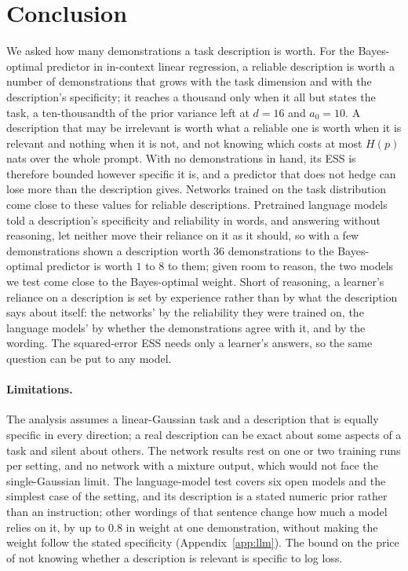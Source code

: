 \documentclass{article}
\begin{document}
\section{Conclusion}
We asked how many demonstrations a task description is worth. For the Bayes-optimal predictor in in-context linear regression, a reliable description is worth a number of demonstrations that grows with the task dimension and with the description's specificity; it reaches a thousand only when it all but states the task, a ten-thousandth of the prior variance left at $d = 16$ and $a_0 = 10$. A description that may be irrelevant is worth what a reliable one is worth when it is relevant and nothing when it is not, and not knowing which costs at most $H(p)$ nats over the whole prompt. With no demonstrations in hand, its ESS is therefore bounded however specific it is, and a predictor that does not hedge can lose more than the description gives. Networks trained on the task distribution come close to these values for reliable descriptions. Pretrained language models told a description's specificity and reliability in words, and answering without reasoning, let neither move their reliance on it as it should, so with a few demonstrations shown a description worth $36$ demonstrations to the Bayes-optimal predictor is worth $1$ to $8$ to them; given room to reason, the two models we test come close to the Bayes-optimal weight. Short of reasoning, a learner's reliance on a description is set by experience rather than by what the description says about itself: the networks' by the reliability they were trained on, the language models' by whether the demonstrations agree with it, and by the wording. The squared-error ESS needs only a learner's answers, so the same question can be put to any model.

\paragraph{Limitations.} The analysis assumes a linear-Gaussian task and a description that is equally specific in every direction; a real description can be exact about some aspects of a task and silent about others. The network results rest on one or two training runs per setting, and no network with a mixture output, which would not face the single-Gaussian limit. The language-model test covers six open models and the simplest case of the setting, and its description is a stated numeric prior rather than an instruction; other wordings of that sentence change how much a model relies on it, by up to $0.8$ in weight at one demonstration, without making the weight follow the stated specificity (Appendix~\ref{app:llm}). The bound on the price of not knowing whether a description is relevant is specific to log loss.
\end{document}
